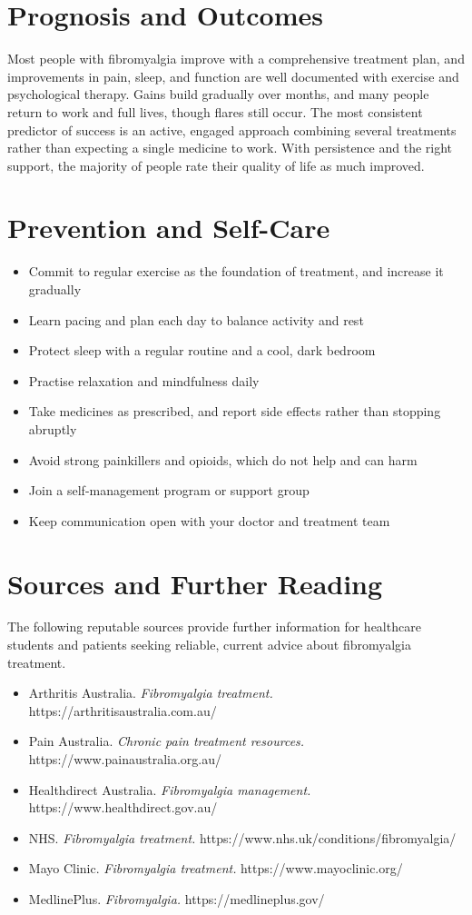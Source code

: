 \section*{Prognosis and Outcomes}
Most people with fibromyalgia improve with a comprehensive treatment plan, and improvements in pain, sleep, and function are well documented with exercise and psychological therapy. Gains build gradually over months, and many people return to work and full lives, though flares still occur. The most consistent predictor of success is an active, engaged approach combining several treatments rather than expecting a single medicine to work. With persistence and the right support, the majority of people rate their quality of life as much improved.

\section*{Prevention and Self-Care}
\begin{itemize}
    \item Commit to regular exercise as the foundation of treatment, and increase it gradually
    \item Learn pacing and plan each day to balance activity and rest
    \item Protect sleep with a regular routine and a cool, dark bedroom
    \item Practise relaxation and mindfulness daily
    \item Take medicines as prescribed, and report side effects rather than stopping abruptly
    \item Avoid strong painkillers and opioids, which do not help and can harm
    \item Join a self-management program or support group
    \item Keep communication open with your doctor and treatment team
\end{itemize}

\section*{Sources and Further Reading}
The following reputable sources provide further information for healthcare students and patients seeking reliable, current advice about fibromyalgia treatment.
\begin{itemize}
    \item Arthritis Australia. \textit{Fibromyalgia treatment.} https://arthritisaustralia.com.au/
    \item Pain Australia. \textit{Chronic pain treatment resources.} https://www.painaustralia.org.au/
    \item Healthdirect Australia. \textit{Fibromyalgia management.} https://www.healthdirect.gov.au/
    \item NHS. \textit{Fibromyalgia treatment.} https://www.nhs.uk/conditions/fibromyalgia/
    \item Mayo Clinic. \textit{Fibromyalgia treatment.} https://www.mayoclinic.org/
    \item MedlinePlus. \textit{Fibromyalgia.} https://medlineplus.gov/
\end{itemize}
